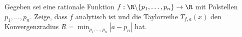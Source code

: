 \begin{prob}
Gegeben sei eine rationale Funktion $f:\R\backslash\{p_1,\ldots,p_n\}\to \R$ mit Polstellen $p_1,\ldots,p_n$.
Zeige, dass $f$ analytisch ist und die Taylorreihe $T_{f,a}(x)$ den Konvergenzradius $R=\min_{p_1,\ldots,p_n}|a-p_n|$ hat.
\end{prob}
